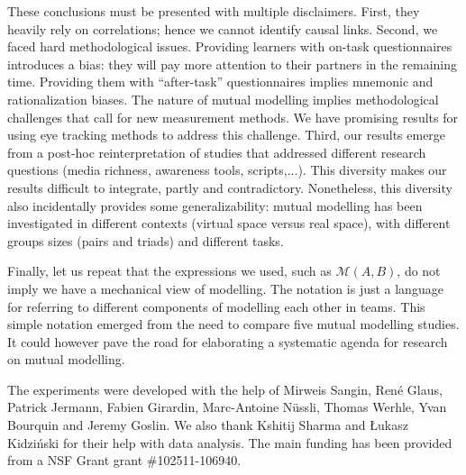 \documentclass[natbib]{svjour3}
\newcommand{\gmodel}[2]{{$\mathcal{M}(#1, #2)$}}
\begin{document}
These conclusions must be presented with multiple disclaimers. First, they
heavily rely on correlations; hence we cannot identify causal links. Second, we
faced hard methodological issues. Providing learners with on-task questionnaires
introduces a bias: they will pay more attention to their partners in the
remaining time. Providing them with ``after-task'' questionnaires implies
mnemonic and rationalization biases. The nature of mutual modelling implies
methodological challenges that call for new measurement methods. We have
promising results for using eye tracking methods to address this challenge.
Third, our results emerge from a post-hoc reinterpretation of studies that
addressed different research questions (media richness, awareness tools,
scripts,...). This diversity makes our results difficult to integrate, partly
and contradictory. Nonetheless, this diversity also incidentally provides some
generalizability: mutual modelling has been investigated in different contexts
(virtual space versus real space), with different groups sizes (pairs and
triads) and different tasks.

Finally, let us repeat that the expressions we used, such as \gmodel{A}{B}, do
not imply we have a mechanical view of modelling. The notation is just a language for
referring to different components of modelling each other in teams.  This simple
notation emerged from the need to compare five mutual modelling studies. It
could however pave the road for elaborating a systematic agenda for research on
mutual modelling.

\begin{acknowledgements}

The experiments were developed with the help of Mirweis Sangin, René Glaus,
Patrick Jermann,  Fabien Girardin, Marc-Antoine Nüssli, Thomas Werhle, Yvan
Bourquin and Jeremy Goslin.  We also thank Kshitij Sharma and {\L}ukasz
Kidzi\'nski for their help with data analysis. The main funding has been
provided from a NSF Grant grant \#102511-106940.

\end{acknowledgements}



\end{document}
